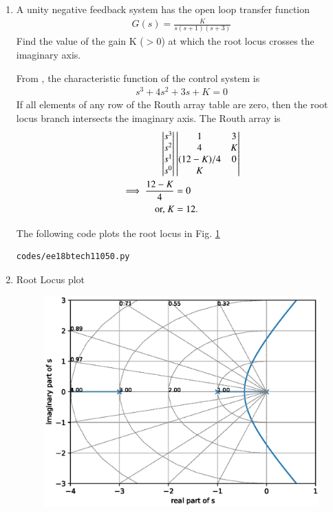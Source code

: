 \begin{enumerate}[label=\thesection.\arabic*.,ref=\thesection.\theenumi]
\item A unity negative feedback system has the open loop transfer function 
\begin{align}
    G(s) = \frac{K}{s(s+1)(s+3)} 
    \label{eq:ee18btech11050_t1}
\end{align}
Find the value of the gain K ($>$0) at which the root locus crosses the imaginary axis.

\solution From     \label{eq:ee18btech11050_t1}, the characteristic function of the control system is 
    \begin{align}
        s^3 + 4s^2 + 3s + K = 0
    \end{align}
%
If all elements of any row of the Routh array table are zero, then the root locus branch intersects the imaginary axis.  The Routh array is
    \begin{align}
        \begin{vmatrix}s^3\\s^2\\s^1\\s^0\end{vmatrix}
&        \begin{vmatrix}1 & 3\\ 4 & K \\ (12-K)/4 & 0 \\ K\end{vmatrix}
\\
  \implies       \frac{12-K}{4} &= 0
\\
\text{or, }K &= 12.
\end{align}

The following code plots the root locus in Fig. \ref{eq:ee18btech11050}

\begin{lstlisting}
codes/ee18btech11050.py
\end{lstlisting}    

\item Root Locus plot
    \begin{figure}[!h]
\centering
        \includegraphics[width=\columnwidth]{./figs/ee18btech11050.eps}
\caption{}
\label{eq:ee18btech11050}
    \end{figure}
	

\end{enumerate}
